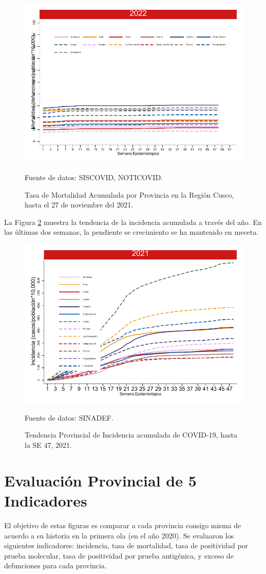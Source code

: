 \documentclass[12pt,a4paper,openany]{book}
\begin{document}
\begin{figure}[h]
	\caption{Tasa de Mortalidad Acumulada por Provincia en la Región Cusco, hasta el 27 de noviembre del 2021. }\label{fig:mortalidad_ordenada}
	\begin{center}
		\includegraphics[width=0.65\linewidth]{../figuras/mortalidad_provincial}
	\end{center}
	{\footnotesize {Fuente de datos: SISCOVID, NOTICOVID.}}
\end{figure}

La Figura \ref{fig:incidencia_provincial} muestra la tendencia de la incidencia acumulada a través del año. En las últimas dos semanas, la pendiente se crecimiento se ha mantenido en meceta. 
%
\begin{figure}[h]
	\caption{Tendencia Provincial de Incidencia acumulada de COVID-19, hasta la SE 47, 2021. }\label{fig:incidencia_provincial}
	\begin{center}
		\includegraphics[width=0.65\linewidth]{../figuras/incidencia_provincial_2021.pdf}
	\end{center}
	{\footnotesize {Fuente de datos: SINADEF.}}
\end{figure}

\clearpage
	
\section*{Evaluación Provincial de 5 Indicadores}
		\noindent El objetivo de estas figuras es comparar a cada provincia consigo misma de acuerdo a su historia  en la primera ola (en el año 2020). Se evaluaron los siguientes indicadores: incidencia, tasa de mortalidad, tasa de positividad por prueba molecular, tasa de positividad por prueba antigénica, y exceso de defunciones para cada provincia.
		
\end{document}
